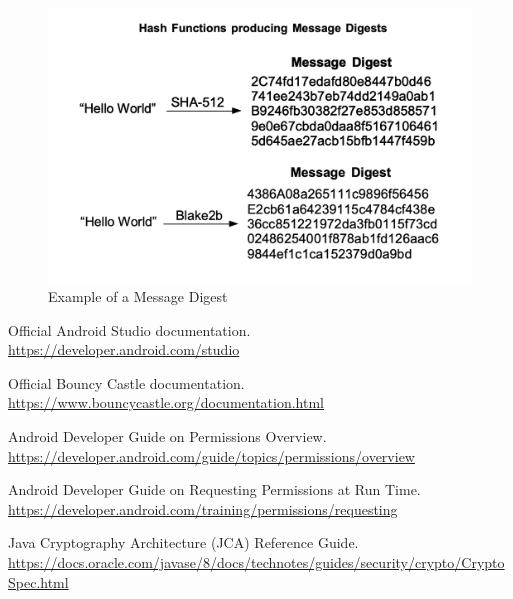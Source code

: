 \documentclass[11pt]{article}
\begin{document}
\begin{enumerate}
          \begin{figure}[H]
              \centering
              \includegraphics[width=.85\textwidth]{message digest/message digest_1.jpg}
              \caption{Example of a Message Digest}
          \end{figure}

\end{enumerate}

\clearpage

\begin{thebibliography}{99} %

    Official Android Studio documentation. \\
    \url{https://developer.android.com/studio}

    Official Bouncy Castle documentation. \\
    \url{https://www.bouncycastle.org/documentation.html}

    Android Developer Guide on Permissions Overview. \\
    \url{https://developer.android.com/guide/topics/permissions/overview}

    Android Developer Guide on Requesting Permissions at Run Time. \\
    \url{https://developer.android.com/training/permissions/requesting}

    Java Cryptography Architecture (JCA) Reference Guide. \\
    \url{https://docs.oracle.com/javase/8/docs/technotes/guides/security/crypto/CryptoSpec.html}

\end{thebibliography}
\end{document}
